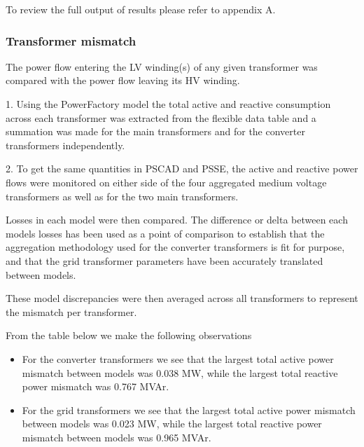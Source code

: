 \documentclass{../grid-link-report}
\begin{document}
	To review the full output of results please refer to appendix A.
	
	\subsubsection{Transformer mismatch}
	\label{Transformer mismatch}
	The power flow entering the LV winding(s) of any given transformer was compared with the power flow leaving its HV winding.
	
	1. Using the PowerFactory model the total active and reactive consumption across each transformer was extracted from the flexible data table and a summation was made for the main transformers and for the converter transformers independently.
	
	2. To get the same quantities in PSCAD and PSSE, the active and reactive power flows were monitored on either side of the four aggregated medium voltage transformers as well as for the two main transformers.
	
	Losses in each model were then compared. The difference or delta between each models losses has been used as a point of comparison to establish that the aggregation methodology used for the converter transformers is fit for purpose, and that the grid transformer parameters have been accurately translated between models.
	
	These model discrepancies were then averaged across all transformers to represent the mismatch per transformer. 
	
	From the table below we make the following observations
	\begin{itemize}
		\item For the converter transformers we see that the largest total active power mismatch between models was  0.038 MW, while the largest total reactive power mismatch was 0.767 MVAr.
		\item For the grid transformers we see that the largest total active power mismatch between models was 0.023 MW, while the largest total reactive power mismatch between models was 0.965 MVAr.
		
	\end{itemize} 
	
\end{document}
